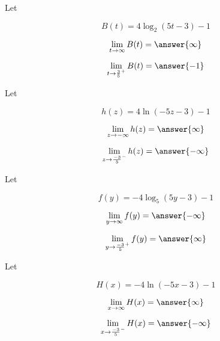 \documentclass{ximera}
\author{Lee Wayand}
\begin{document}
\begin{exercise}


\begin{question}



Let 

\[
B(t) = 4 \log_{2}(5t - 3) - 1
\]



\[
\lim\limits_{t \to \infty} B(t) = \answer{\infty}
\]



\[
\lim\limits_{t \to \frac{3}{5}^+} B(t) = \answer{-1}
\]

\end{question}







\begin{question}



Let 

\[
h(z) = 4 \ln(-5z - 3) - 1
\]


\[
\lim\limits_{z \to -\infty} h(z) = \answer{\infty}
\]



\[
\lim\limits_{z \to \frac{-3}{5}^-} h(z) = \answer{-\infty}
\]

\end{question}





\begin{question}



Let 

\[
f(y) = -4 \log_{5}(5y - 3) - 1
\]


\[
\lim\limits_{y \to \infty} f(y) = \answer{-\infty}
\]



\[
\lim\limits_{y \to \frac{-3}{5}^+} f(y) = \answer{\infty}
\]


\end{question}





\begin{question}



Let 

\[
H(x) = -4 \ln(-5x - 3) - 1
\]


\[
\lim\limits_{x \to \infty} H(x) = \answer{\infty}
\]



\[
\lim\limits_{x \to \frac{-3}{5}^-} H(x) = \answer{-\infty}
\]

\end{question}








\end{exercise}
\end{document}
